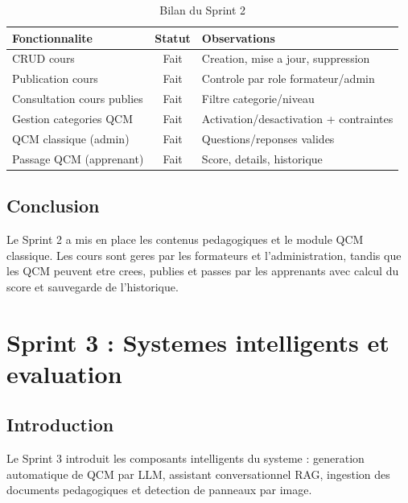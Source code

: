 \documentclass[a4paper,12pt]{report}
\begin{document}
\begin{table}[H]
  \centering
  \caption{Bilan du Sprint 2}
  \label{tab:bilan_s2}
  \begin{tabular}{|p{5cm}|c|p{6.5cm}|}
    \hline
    \textbf{Fonctionnalite} & \textbf{Statut} & \textbf{Observations} \\
    \hline
    CRUD cours & Fait & Creation, mise a jour, suppression \\
    \hline
    Publication cours & Fait & Controle par role formateur/admin \\
    \hline
    Consultation cours publies & Fait & Filtre categorie/niveau \\
    \hline
    Gestion categories QCM & Fait & Activation/desactivation + contraintes \\
    \hline
    QCM classique (admin) & Fait & Questions/reponses valides \\
    \hline
    Passage QCM (apprenant) & Fait & Score, details, historique \\
    \hline
  \end{tabular}
\end{table}

\section*{Conclusion}

Le Sprint 2 a mis en place les contenus pedagogiques et le module QCM classique.
Les cours sont geres par les formateurs et l'administration, tandis que les QCM
peuvent etre crees, publies et passes par les apprenants avec calcul du score
et sauvegarde de l'historique.

\clearpage

\chapter{Sprint 3 : Systemes intelligents et evaluation}
\minitoc
\newpage

\section*{Introduction}

Le Sprint 3 introduit les composants intelligents du systeme : generation
automatique de QCM par LLM, assistant conversationnel RAG, ingestion des
documents pedagogiques et detection de panneaux par image.
\end{document}
